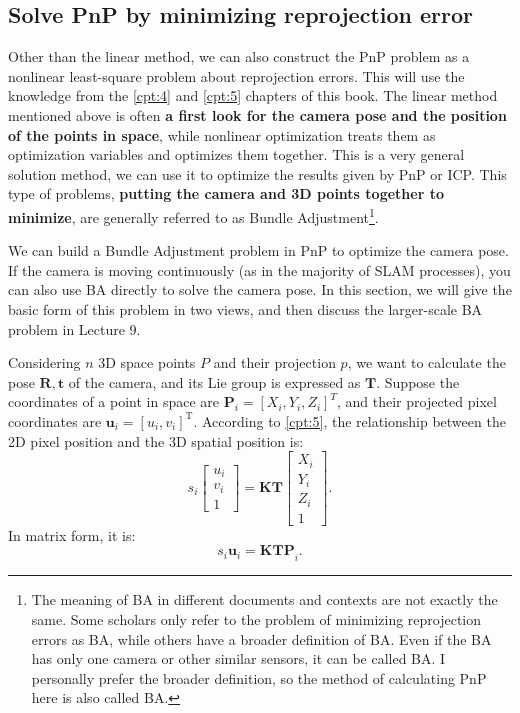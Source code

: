 \subsection{Solve PnP by minimizing reprojection error}
\label{sec:BA-vo1}
Other than the linear method, we can also construct the PnP problem as a nonlinear least-square problem about reprojection errors. This will use the knowledge from the \ref{cpt:4} and \ref{cpt:5} chapters of this book. The linear method mentioned above is often \textbf{a first look for the camera pose and the position of the points in space}, while nonlinear optimization treats them as optimization variables and optimizes them together. This is a very general solution method, we can use it to optimize the results given by PnP or ICP. This type of problems, \textbf{putting the camera and 3D points together to minimize}, are generally referred to as Bundle Adjustment\footnote{The meaning of BA in different documents and contexts are not exactly the same. Some scholars only refer to the problem of minimizing reprojection errors as BA, while others have a broader definition of BA. Even if the BA has only one camera or other similar sensors, it can be called BA. I personally prefer the broader definition, so the method of calculating PnP here is also called BA.}.

We can build a Bundle Adjustment problem in PnP to optimize the camera pose. If the camera is moving continuously (as in the majority of SLAM processes), you can also use BA directly to solve the camera pose. In this section, we will give the basic form of this problem in two views, and then discuss the larger-scale BA problem in Lecture 9.

Considering $n$ 3D space points $P$ and their projection $p$, we want to calculate the pose $\mathbf{R}, \mathbf{t}$ of the camera, and its Lie group is expressed as $\mathbf{T}$. Suppose the coordinates of a point in space are $\mathbf{P}_i=[X_i,Y_i,Z_i]^T$, and their projected pixel coordinates are $\mathbf{u}_i=[u_i,v_i]^ \mathrm{T}$. According to \ref{cpt:5}, the relationship between the 2D pixel position and the 3D spatial position is:
\begin{equation}
s_i \left[ 
\begin{array}{l}
u_i \\ v_i \\ 1
\end{array}
\right] = \mathbf{K} \mathbf{T} \left[ 
\begin{array}{l}
X_i \\ Y_i \\ Z_i \\ 1
\end{array} \right]  .
\end{equation}
In matrix form, it is:
\[
{{s_i {\mathbf{u}}_i} = \mathbf{K} \mathbf{T} \mathbf{P}}_i.
\]

